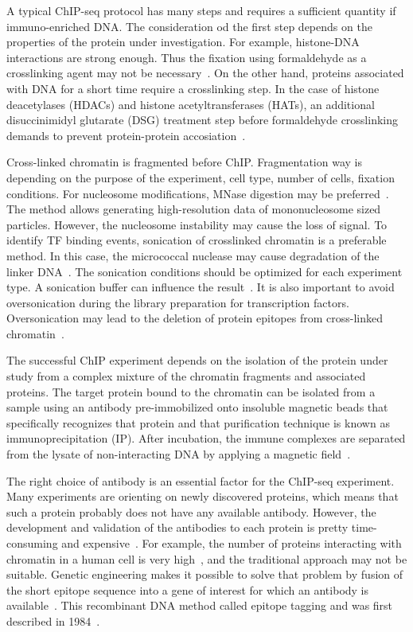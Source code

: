 A typical ChIP-seq protocol has many steps and requires a sufficient quantity if immuno-enriched DNA. 
The consideration od the first step depends on the properties of the protein under investigation. 
For example, histone-DNA interactions are strong enough. 
Thus the fixation using formaldehyde as a crosslinking agent may not be necessary~\cite{barski2008identification}. 
On the other hand, proteins associated with DNA for a short time require a crosslinking step. 
In the case of histone deacetylases (HDACs) and histone acetyltransferases (HATs), an additional disuccinimidyl glutarate (DSG) treatment step before formaldehyde crosslinking demands to prevent protein-protein accosiation~\cite{wang2009genome}. 

Cross-linked chromatin is fragmented before ChIP. 
Fragmentation way is depending on the purpose of the experiment, cell type, number of cells, fixation conditions. 
For nucleosome modifications, MNase digestion may be preferred~\cite{kidder2011chip}.  
The method allows generating high-resolution data of mononucleosome sized particles. 
However, the nucleosome instability may cause the loss of signal.
To identify TF binding events, sonication of crosslinked chromatin is a preferable method. 
In this case, the micrococcal nuclease may cause degradation of the linker DNA~\cite{kidder2011chip}.
The sonication conditions should be optimized for each experiment type. 
A sonication buffer can influence the result~\cite{steger2008dot1l}. 
It is also important to avoid oversonication during the library preparation for transcription factors. 
Oversonication may lead to the deletion of protein epitopes from cross-linked chromatin~\cite{ostrow2015chip}. 


The successful ChIP experiment depends on the isolation of the protein under study from a complex mixture of the chromatin fragments and associated proteins. 
The target protein bound to the chromatin can be isolated from a sample using an antibody pre-immobilized onto insoluble magnetic beads that specifically recognizes that protein and that purification technique is known as immunoprecipitation (IP). 
After incubation, the immune complexes are separated from the lysate of non-interacting DNA by applying a magnetic field~\cite{slovakova2005use}.

The right choice of antibody is an essential factor for the ChIP-seq experiment. 
Many experiments are orienting on newly discovered proteins, which means that such a protein probably does not have any available antibody. 
However, the development and validation of the antibodies to each protein is pretty time-consuming and expensive~\cite{jarvik1998epitope}. 
For example, the number of proteins interacting with chromatin in a human cell is very high~\cite{ramani2005consolidating}, and the traditional approach may not be suitable.
Genetic engineering makes it possible to solve that problem by fusion of the short epitope sequence into a gene of interest for which an antibody is available~\cite{jarvik1998epitope,brizzard2008epitope,goldberg2010distinct}. 
This recombinant DNA method called epitope tagging and was first described in 1984~\cite{munro1984use}. 


